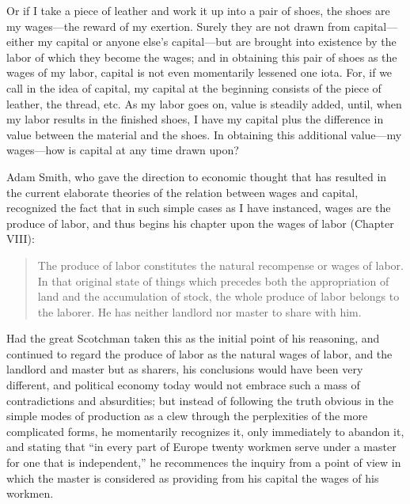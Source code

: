 Or if I take a piece of leather and work it up into a pair of shoes, the
shoes are my wages---the reward of my exertion. Surely they are not
drawn from capital---either my capital or anyone else's capital---but
are brought into existence by the labor of which they become the wages;
and in obtaining this pair of shoes as the wages of my labor, capital is
not even momentarily lessened one iota. For, if we call in the idea of
capital, my capital at the beginning consists of the piece of leather,
the thread, etc. As my labor goes on, value is steadily added, until,
when my labor results in the finished shoes, I have my capital plus the
difference in value between the material and the shoes. In obtaining
this additional value---my wages---how is capital at any time drawn
upon?

Adam Smith, who gave the direction to economic thought that has resulted
in the current elaborate theories of the relation between wages and
capital, recognized the fact that in such simple cases as I have
instanced, wages are the produce of labor, and thus begins his chapter
upon the wages of labor (Chapter VIII):

\begin{quote}
The produce of labor constitutes the natural recompense or wages of
labor. In that original state of things which precedes both the
appropriation of land and the accumulation of stock, the whole produce
of labor belongs to the laborer. He has neither landlord nor master to
share with him.
\end{quote}

Had the great Scotchman taken this as the initial point of his
reasoning, and continued to regard the produce of labor as the natural
wages of labor, and the landlord and master but as sharers, his
conclusions would have been very different, and political economy today
would not embrace such a mass of contradictions and absurdities; but
instead of following the truth obvious in the simple modes of production
as a clew through the perplexities of the more complicated forms, he
momentarily recognizes it, only immediately to abandon it, and stating
that ``in every part of Europe twenty workmen serve under a master for
one that is independent,'' he recommences the inquiry from a point of
view in which the master is considered as providing from his capital the
wages of his workmen.

